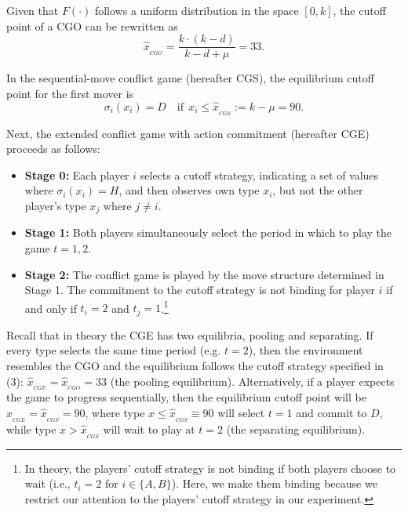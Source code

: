 \documentclass[12pt,english]{article}
\begin{document}
\noindent Given that $F(\cdot)$ follows a uniform distribution in the space $[0,k]$, the cutoff point of a CGO can be rewritten as 
\begin{equation}
\hat{x}_{_{CGO}}= \frac{k\cdot (k-d)}{k-d+\mu}=33. \label{eq:cgosol}
\end{equation}\par
In the sequential-move conflict game (hereafter CGS), the equilibrium cutoff point for the first mover is 
\begin{equation}
\sigma_i(x_i)=D \quad \text{if} \ \ x_i\leq \hat{x}_{_{CGS}}:= k-\mu=90. 
\end{equation}\par
Next, the extended conflict game with action commitment (hereafter CGE) proceeds as follows:
\begin{itemize}\itemsep-2pt
\item \textbf{Stage 0:} Each player $i$ selects a cutoff strategy, indicating a set of values where $\sigma_i(x_i)=H$, and then observes own type $x_i$, but not the other player's type $x_j$ where $j\neq i$.

\item \textbf{Stage 1:} Both players simultaneously select the period in which to play the game $t=1,2$. 

\item \textbf{Stage 2:} The conflict game is played by the move structure determined in Stage 1. The commitment to the cutoff strategy is not binding for player $i$ if and only if $t_i=2$ and $t_j=1$.\footnote{In theory, the players' cutoff strategy is not binding if both players choose to wait (i.e., $t_i=2$ for $i \in \{A,B\}$). Here, we make them binding because we restrict our attention to the players' cutoff strategy in our experiment.} 
\end{itemize}\par

Recall that in theory the CGE has two equilibria, pooling and separating. If every type selects the same time period (e.g. $t=2$), then the environment resembles the CGO and the equilibrium follows the cutoff strategy specified in (3): $\hat{x}_{_{CGE}}=\hat{x}_{_{CGO}}=33$ (the pooling equilibrium). Alternatively, if a player expects the game to progress sequentially, then the equilibrium cutoff point will be $\hat{x}_{_{CGE}}=\hat{x}_{_{CGS}}=90$, where type $x\leq \hat{x}_{_{CGS}}\equiv 90$ will select $t=1$ and commit to $D$, while type $x>\hat{x}_{_{CGS}}$ will wait to play at $t=2$ (the separating equilibrium). \\
\end{document}
